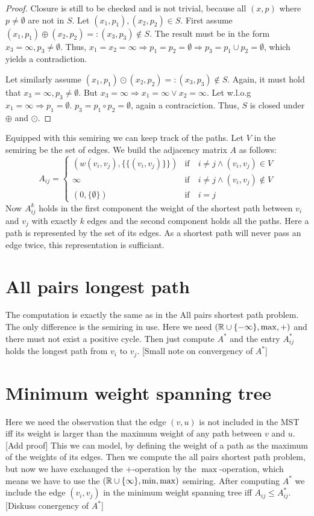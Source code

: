 \begin{proof}
    Closure is still to be checked and is not trivial, because all $(x, p)$ where $p \neq \emptyset$ are not in $S$. Let $(x_1, p_1), (x_2, p_2) \in S$. First assume $(x_1, p_1) \oplus (x_2, p_2) =: (x_3, p_3) \notin S$. The result must be in the form $x_3 = \infty, p_3 \neq \emptyset$. Thus, $x_1 = x_2 = \infty \Rightarrow p_1 = p_2 = \emptyset \Rightarrow p_3 = p_1 \cup p_2 = \emptyset$, which yields a contradiction.

    Let similarly assume $(x_1, p_1) \odot (x_2, p_2) =: (x_3, p_3) \notin S$. Again, it must hold that $x_3 = \infty, p_3 \neq \emptyset$. But $x_3 = \infty \Rightarrow x_1 = \infty \lor x_2 = \infty$. Let w.l.o.g $x_1 = \infty \Rightarrow p_1 = \emptyset$. $p_3 = p_1 \circ p_2 = \emptyset$, again a contraciction. Thus, $S$ is closed under $\oplus$ and $\odot$.
\end{proof}
Equipped with this semiring we can keep track of the paths. Let $V$ in the semiring be the set of edges. We build the adjacency matrix $A$ as follows:
$$A_{ij} = \begin{cases}
    (w(v_i, v_j), \{\{(v_i, v_j)\}\}) &\textrm{if}\quad i \neq j \land (v_i, v_j) \in V\\
    \infty &\textrm{if}\quad i \neq j \land (v_i, v_j) \notin V\\
    (0, \{\emptyset\}) &\textrm{if}\quad i = j
\end{cases}$$
Now $A^k_{ij}$ holds in the first component the weight of the shortest path between $v_i$ and $v_j$ with exactly $k$ edges and the second component holds all the paths. Here a path is represented by the set of its edges. As a shortest path will never pass an edge twice, this representation is sufficiant. 

\section{All pairs longest path}
The computation is exactly the same as in the All pairs shortest path problem. The only difference is the semiring in use. Here we need $(\mathbb{R} \cup \{-\infty\}, \max, +)$ and there must not exist a positive cycle. Then just compute $A^*$ and the entry $A^*_{ij}$ holds the longest path from $v_i$ to $v_j$. [Small note on convergency of $A^*$]

\section{Minimum weight spanning tree}
Here we need the observation that the edge $(v, u)$ is not included in the MST iff its weight is larger than the maximum weight of any path between $v$ and $u$. [Add proof] This we can model, by defining the weight of a path as the maximum of the weights of its edges. Then we compute the all pairs shortest path problem, but now we have exchanged the $+$-operation by the $\max$-operation, which means we have to use the $(\mathbb{R} \cup\{\infty\}, \min, \max)$ semiring. After computing $A^*$ we include the edge $(v_i, v_j)$ in the minimum weight spanning tree iff $A_{ij} \leq A^*_{ij}$.
[Diskuss conergency of $A^*$]

